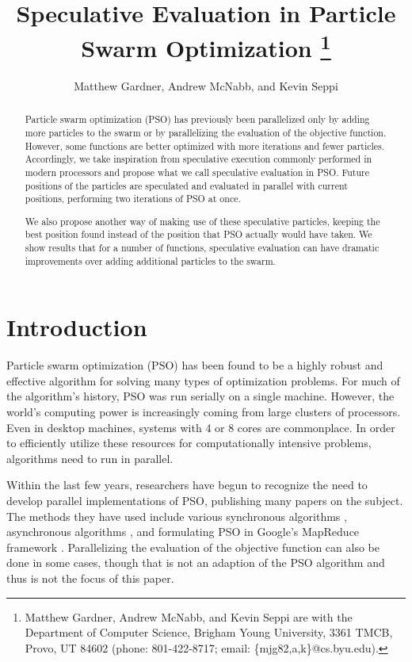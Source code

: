 \documentclass[conference,letterpaper]{IEEEtran}
\title{\ \\ \LARGE\bf Speculative Evaluation in Particle Swarm Optimization%
\thanks{Matthew Gardner, Andrew McNabb, and Kevin Seppi are with the Department
of Computer Science, Brigham Young University, 3361 TMCB, Provo, UT 84602
(phone: 801-422-8717; email: \{mjg82,a,k\}@cs.byu.edu).}%
}
\date{}
\author{Matthew Gardner, Andrew McNabb, and Kevin Seppi}
\begin{document}
\maketitle

\begin{abstract}

Particle swarm optimization (PSO) has previously been parallelized only by 
adding more particles to the swarm or by parallelizing the evaluation of the
objective function.  However, some functions are better optimized with more
iterations and fewer particles.  Accordingly, we take inspiration from 
speculative execution commonly performed in modern processors and propose what
we call speculative evaluation in PSO.  Future positions of the particles are
speculated and evaluated in parallel with current positions, performing two
iterations of PSO at once.

We also propose another way of making use of these speculative particles,
keeping the best position found instead of the position that PSO actually would
have taken.  We show results that for a number of functions, speculative
evaluation can have dramatic improvements over adding additional particles to
the swarm.

\end{abstract}

\section{Introduction}
\label{sec:intro}

Particle swarm optimization (PSO) has been found to be a highly robust and
effective algorithm for solving many types of optimization problems.  For much
of the algorithm's history, PSO was run serially on a single machine.  However,
the world's computing power is increasingly coming from large clusters of
processors.  Even in desktop machines, systems with 4 or 8 cores are
commonplace.  In order to efficiently utilize these resources for
computationally intensive problems, algorithms need to run in parallel.

Within the last few years, researchers have begun to recognize the need to
develop parallel implementations of PSO, publishing many papers on the subject.
The methods they have used include various synchronous algorithms
\cite{belal-ijicis04,chu-sci06,jin-aps05,parsopoulos-aia04,schutte-ijnme04},
asynchronous algorithms \cite{koh-ijnme06,mostaghim-report06,venter-wcsmo05},
and formulating PSO in Google's MapReduce framework \cite{mcnabb-cec07}.
Parallelizing the evaluation of the objective function can also be done in some
cases, though that is not an adaption of the PSO algorithm and thus is not the
focus of this paper.
\end{document}
